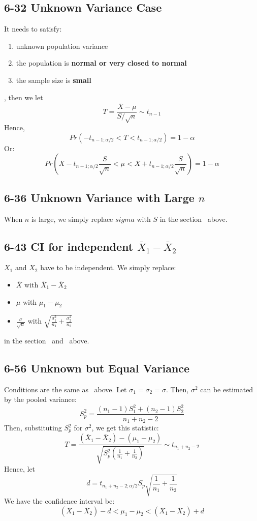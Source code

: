 \documentclass[12pt,landscape]{article}
\begin{document}
\begin{multicols}{3}
    \subsection{6-32 Unknown Variance Case}
    \label{6-32}
    It needs to satisfy:
    \begin{enumerate}
        \item unknown population variance
        \item the population is \textbf{normal or very closed to normal}
        \item the sample size is \textbf{small}
    \end{enumerate}
    , then we let
        $$ T = \frac{\bar{X} - \mu}{S / \sqrt{n}} \sim t_{n-1} $$
    Hence,
        $$ Pr(-t_{n-1;\alpha/2} < T < t_{n-1;\alpha/2}) = 1 - \alpha $$
    Or:
        $$ Pr(\bar{X} - t_{n-1;\alpha/2}\frac{S}{\sqrt{n}} < \mu < \bar{X} + t_{n-1;\alpha/2}\frac{S}{\sqrt{n}}) = 1 - \alpha $$

    \subsection{6-36 Unknown Variance with Large $n$}
    When $n$ is large, we simply replace $sigma$ with $S$ in the section~ above.

    \subsection{6-43 CI for independent $\bar{X}_1 - \bar{X}_2$}
    $X_1$ and $X_2$ have to be independent. We simply replace:
    \begin{itemize}
        \item $\bar{X}$ with $\bar{X}_1 - \bar{X}_2$
        \item $\mu$ with $\mu_1 - \mu_2$
        \item $\frac{\sigma}{\sqrt{n}}$ with $\sqrt{\frac{\sigma_1^2}{n_1} + \frac{\sigma_2^2}{n_2}}$
    \end{itemize}
    in the section~ and~ above.

    \subsection{6-56 Unknown but Equal Variance}
    Conditions are the same as~ above. Let $\sigma_1 = \sigma_2 = \sigma$. Then, $\sigma^2$ can be
    estimated by the pooled variance:
        $$ S_p^2 = \frac{(n_1-1)S_1^2 + (n_2-1)S_2^2}{n_1+n_2-2} $$
    Then, substituting $S_p^2$ for $\sigma^2$, we get this statistic:
        $$ T = \frac{(\bar{X}_1 - \bar{X}_2) - (\mu_1 - \mu_2)}{\sqrt{S_p^2(\frac{1}{n_1} + \frac{1}{n_2})}} \sim t_{n_1+n_2-2} $$
    Hence, let
        $$ d = t_{n_1+n_2-2;\alpha/2} S_p \sqrt{\frac{1}{n_1} + \frac{1}{n_2}} $$
    We have the confidence interval be:
        $$ (\bar{X}_1 - \bar{X}_2) - d < \mu_1 - \mu_2 < (\bar{X}_1 - \bar{X}_2) + d $$
    

\end{multicols}
\end{document}
